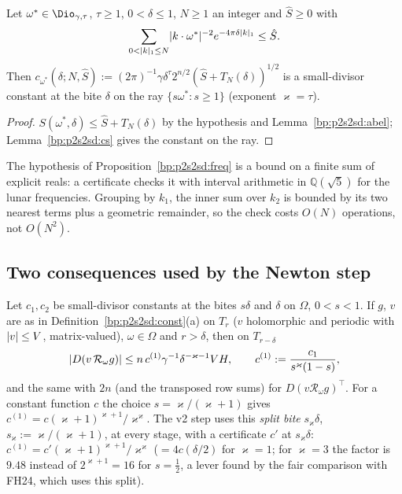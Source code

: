\begin{proposition}\label{bp:p2s2sd:freq}
Let $\omega^*\in\Dio_{\gamma,\tau}$, $\tau\ge1$, $0<\delta\le1$, $N\ge1$ an integer and $\hat S\ge0$ with
\[
\sum_{0<\lvert k\rvert_1\le N}\lvert k\cdot\omega^*\rvert^{-2}e^{-4\pi\delta\lvert k\rvert_1}\le\hat S .
\]
Then $c_{\omega^*}(\delta;N,\hat S):=(2\pi)^{-1}\gamma\delta^\tau2^{n/2}(\hat S+T_N(\delta))^{1/2}$ is a small-divisor constant at the bite $\delta$ on the
ray $\{s\omega^*:s\ge1\}$ (exponent $\varkappa=\tau$).
\end{proposition}

\begin{proof}
\label{step:p2s2sd:fr}
$S(\omega^*,\delta)\le\hat S+T_N(\delta)$ by the hypothesis and Lemma~\ref{bp:p2s2sd:abel}; Lemma~\ref{bp:p2s2sd:cs} gives the constant on the
ray.
\end{proof}

The hypothesis of Proposition~\ref{bp:p2s2sd:freq} is a bound on a finite sum of explicit reals: a certificate checks it with
interval arithmetic in $\mathbb Q(\sqrt5)$ for the lunar frequencies. Grouping by $k_1$, the inner sum over $k_2$ is bounded by its two
nearest terms plus a geometric remainder, so the check costs $O(N)$ operations, not $O(N^2)$.

\subsection{Two consequences used by the Newton step}

\begin{corollary}\label{bp:p2s2sd:rc}
Let $c_1,c_2$ be small-divisor constants at the bites $s\delta$ and $\delta$ on $\Omega$, $0<s<1$. If $g$, $v$ are as in
Definition~\ref{bp:p2s2sd:const}(a) on $T_r$ ($v$ holomorphic and periodic with $\lvert v\rvert\le V$, matrix-valued), $\omega\in\Omega$ and $r>\delta$,
then on $T_{r-\delta}$
\[
\lvert D(v\,\mathcal R_\omega g)\rvert\le n\,c^{(1)}\gamma^{-1}\delta^{-\varkappa-1}VH,\qquad c^{(1)}:=\frac{c_1}{s^\varkappa(1-s)},
\]
and the same with $2n$ (and the transposed row sums) for $D(v\mathcal R_\omega g)^\top$. For a constant function $c$ the choice
$s=\varkappa/(\varkappa+1)$ gives $c^{(1)}=c(\varkappa+1)^{\varkappa+1}/\varkappa^\varkappa$. The v2 step uses this \emph{split bite}
$s_\varkappa\delta$, $s_\varkappa:=\varkappa/(\varkappa+1)$, at every stage, with a certificate $c'$ at $s_\varkappa\delta$: $c^{(1)}=c'(\varkappa+1)^{\varkappa+1}/\varkappa^\varkappa$
($=4c(\delta/2)$ for $\varkappa=1$; for $\varkappa=3$ the factor is $9.48$ instead of $2^{\varkappa+1}=16$ for $s=\frac12$, a lever found by the fair
comparison with FH24, which uses this split).
\end{corollary}

